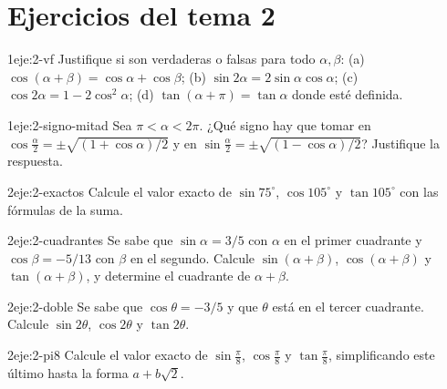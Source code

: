 \section*{Ejercicios del tema 2}

\begin{ejercicio}{1}{eje:2-vf}
Justifique si son verdaderas o falsas para todo $\alpha,\beta$: (a) $\cos(\alpha+\beta)=\cos\alpha+\cos\beta$; (b) $\sin2\alpha=2\sin\alpha\cos\alpha$; (c) $\cos2\alpha=1-2\cos^{2}\alpha$; (d) $\tan(\alpha+\pi)=\tan\alpha$ donde esté definida.
\end{ejercicio}

\begin{ejercicio}{1}{eje:2-signo-mitad}
Sea $\pi<\alpha<2\pi$. ¿Qué signo hay que tomar en $\cos\frac{\alpha}{2}=\pm\sqrt{(1+\cos\alpha)/2}$ y en $\sin\frac{\alpha}{2}=\pm\sqrt{(1-\cos\alpha)/2}$? Justifique la respuesta.
\end{ejercicio}

\begin{ejercicio}{2}{eje:2-exactos}
Calcule el valor exacto de $\sin 75^{\circ}$, $\cos 105^{\circ}$ y $\tan 105^{\circ}$ con las fórmulas de la suma.
\end{ejercicio}

\begin{ejercicio}{2}{eje:2-cuadrantes}
Se sabe que $\sin\alpha=3/5$ con $\alpha$ en el primer cuadrante y $\cos\beta=-5/13$ con $\beta$ en el segundo. Calcule $\sin(\alpha+\beta)$, $\cos(\alpha+\beta)$ y $\tan(\alpha+\beta)$, y determine el cuadrante de $\alpha+\beta$.
\end{ejercicio}

\begin{ejercicio}{2}{eje:2-doble}
Se sabe que $\cos\theta=-3/5$ y que $\theta$ está en el tercer cuadrante. Calcule $\sin2\theta$, $\cos2\theta$ y $\tan2\theta$.
\end{ejercicio}

\begin{ejercicio}{2}{eje:2-pi8}
Calcule el valor exacto de $\sin\frac{\pi}{8}$, $\cos\frac{\pi}{8}$ y $\tan\frac{\pi}{8}$, simplificando este último hasta la forma $a+b\sqrt2$.
\end{ejercicio}

